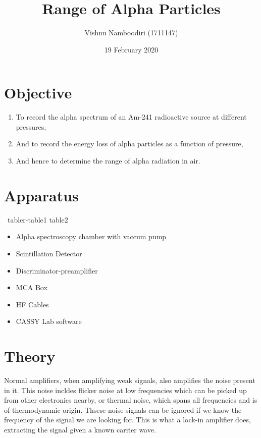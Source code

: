 \documentclass[a4paper]{article}
\title{\textbf{Range of Alpha Particles}}
\author{Vishnu Namboodiri (1711147)}
\date{19 February 2020}
\begin{document}
\maketitle





\section*{Objective}




\begin{enumerate}
	\item To record the alpha spectrum of an Am-241 radioactive source at different pressures,
	\item And to record the energy loss of alpha particles as a function of pressure, 
	\item And hence to determine the range of alpha radiation in air.
\end{enumerate}



\section*{Apparatus}


~tabler-table1 table2~

\begin{itemize}
	\item Alpha spectroscopy chamber with vaccum pump
	\item Scintillation Detector
	\item Discriminator-preamplifier
	\item MCA Box
	\item HF Cables
	\item CASSY Lab software
\end{itemize}


\section*{Theory}


Normal amplifiers, when amplifying weak signals, also amplifies the noise present in it. This noise incldes flicker noise at low frequencies which can be picked up from other electronics nearby, or thermal noise, which spans all frequencies and is of thermodynamic origin. Thsese noise signals can be ignored if we know the frequency of the signal we are looking for. This is what a lock-in amplifier does, extracting the signal given a known carrier wave.
\end{document}
